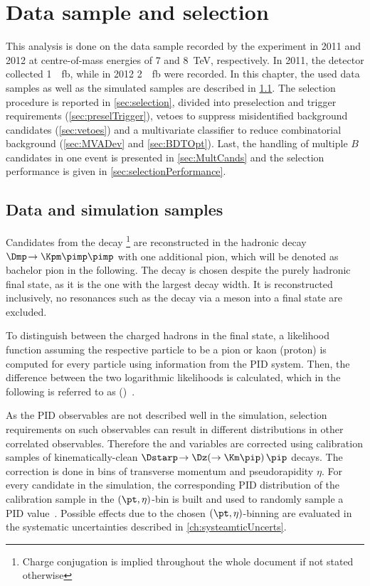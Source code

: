 \chapter{Data sample and selection}
\label{chap:selection}

\linespread{1.08}\selectfont
This analysis is done on the data sample recorded by the \lhcb experiment in \num{2011} and \num{2012} at centre-of-mass energies of \num{7} and \SI{8}{\tera\electronvolt}, respectively.
In \num{2011}, the detector collected \SI{1}{\per\femto\barn}, while in \num{2012} \SI{2}{\per\femto\barn} were recorded.
In this chapter, the used data samples as well as the simulated samples are described in \cref{sec:Samples}.
The selection procedure is reported in \cref{sec:selection}, divided into preselection and trigger requirements (\cref{sec:preselTrigger}), vetoes to suppress \eg misidentified background candidates (\cref{sec:vetoes}) and a multivariate classifier to reduce combinatorial background (\cref{sec:MVADev} and \cref{sec:BDTOpt}).
Last, the handling of multiple $B$ candidates in one event is presented in \cref{sec:MultCands} and the selection performance is given in \cref{sec:selectionPerformance}.

\section{Data and simulation samples}
\label{sec:Samples}

Candidates from the decay \BdToDpi\footnote{Charge conjugation is implied throughout the whole document if not stated otherwise} are reconstructed in the hadronic decay $\Dmp\!\to\Kpm\pimp\pimp$ with one additional pion, which will be denoted as bachelor pion in the following.
The \D decay is chosen despite the purely hadronic final state, as it is the one with the largest decay width.
It is reconstructed inclusively, \ie no resonances such as the decay via a \Kstarz meson into a \kaon\pion final state are excluded.

To distinguish between the charged hadrons in the final state, a likelihood function assuming the respective particle to be a pion or kaon (proton) is computed for every particle using information from the PID system.
Then, the difference between the two logarithmic likelihoods is calculated, which in the following is referred to as \dllkpi (\dllppi)~\cite{Aaij:2014jba}.

As the PID observables are not described well in the simulation, selection requirements on such observables can result in different distributions in other correlated observables.
Therefore the \dllkpi and \dllppi variables are corrected using calibration samples of kinematically-clean $\Dstarp\!\to\Dz\!\left(\to\Km\pip\right)\pip$ decays.
The correction is done in bins of transverse momentum \pt and pseudorapidity $\eta$.
For every candidate in the simulation, the corresponding PID distribution of the calibration sample in the $(\pt,\eta)$-bin is built and used to randomly sample a PID value~\cite{Anderlini:2202412}.
Possible effects due to the chosen $(\pt,\eta)$-binning are evaluated in the systematic uncertainties described in \cref{ch:systeamticUncerts}.

